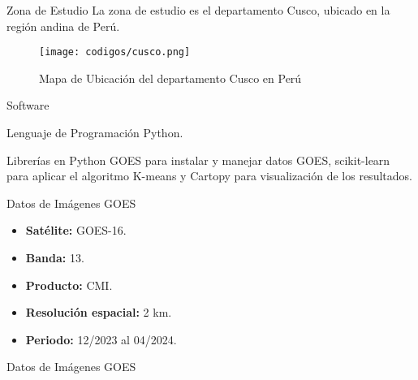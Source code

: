 \documentclass[aspectratio=169,xcolor=dvipsnames]{beamer}
\begin{document}
\begin{frame}{Zona de Estudio}
    La zona de estudio es el departamento Cusco, ubicado en la región andina de Perú.
    \begin{figure}
            \centering
            \texttt{[image: codigos/cusco.png]}
            {\footnotesize %
            \caption{Mapa de Ubicación del departamento Cusco en Perú}
            \label{fig2}
            }
    \end{figure}
\end{frame}

\begin{frame}{Software}
    
    \begin{block}{Lenguaje de Programación}
        Python.
    \end{block}

    \begin{block}{Librerías en Python}
        GOES para instalar y manejar datos GOES, scikit-learn para aplicar el algoritmo K-means y Cartopy para visualización de los resultados.
    \end{block}
\end{frame}

\begin{frame}{Datos de Imágenes GOES}
    
    \begin{itemize}
        \item \textbf{Satélite:} GOES-16.
        \item \textbf{Banda:} 13.
        \item \textbf{Producto:} CMI.
        \item \textbf{Resolución espacial:} 2 km.
        \item \textbf{Periodo:} 12/2023 al 04/2024.
    \end{itemize}
\end{frame}
\begin{frame}{Datos de Imágenes GOES}
    \begin{table}[h]
        \centering
        \caption{Fecha y hora de los datos GOES para cada mes dentro del periodo 12/2023 al 04/2024} 
        \label{tab2} 
    \end{table}
\end{frame}
\end{document}
